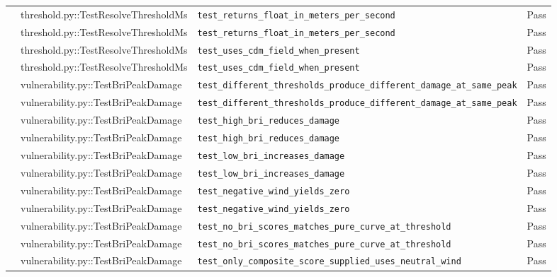 \documentclass[11pt,a4paper]{article}
\begin{document}
\begin{center}
\begin{longtable}{p{2.2cm} p{4.5cm} p{6.5cm} p{1.4cm}}
     & threshold.py::TestResolveThresholdMs & \texttt{test\_returns\_float\_in\_meters\_per\_second} & \textcolor{green!60!black}{Pass} \\
     & threshold.py::TestResolveThresholdMs & \texttt{test\_returns\_float\_in\_meters\_per\_second} & \textcolor{green!60!black}{Pass} \\
     & threshold.py::TestResolveThresholdMs & \texttt{test\_uses\_cdm\_field\_when\_present} & \textcolor{green!60!black}{Pass} \\
     & threshold.py::TestResolveThresholdMs & \texttt{test\_uses\_cdm\_field\_when\_present} & \textcolor{green!60!black}{Pass} \\
     & vulnerability.py::TestBriPeakDamage & \texttt{test\_different\_thresholds\_produce\_different\_damage\_at\_same\_peak} & \textcolor{green!60!black}{Pass} \\
     & vulnerability.py::TestBriPeakDamage & \texttt{test\_different\_thresholds\_produce\_different\_damage\_at\_same\_peak} & \textcolor{green!60!black}{Pass} \\
     & vulnerability.py::TestBriPeakDamage & \texttt{test\_high\_bri\_reduces\_damage} & \textcolor{green!60!black}{Pass} \\
     & vulnerability.py::TestBriPeakDamage & \texttt{test\_high\_bri\_reduces\_damage} & \textcolor{green!60!black}{Pass} \\
     & vulnerability.py::TestBriPeakDamage & \texttt{test\_low\_bri\_increases\_damage} & \textcolor{green!60!black}{Pass} \\
     & vulnerability.py::TestBriPeakDamage & \texttt{test\_low\_bri\_increases\_damage} & \textcolor{green!60!black}{Pass} \\
     & vulnerability.py::TestBriPeakDamage & \texttt{test\_negative\_wind\_yields\_zero} & \textcolor{green!60!black}{Pass} \\
     & vulnerability.py::TestBriPeakDamage & \texttt{test\_negative\_wind\_yields\_zero} & \textcolor{green!60!black}{Pass} \\
     & vulnerability.py::TestBriPeakDamage & \texttt{test\_no\_bri\_scores\_matches\_pure\_curve\_at\_threshold} & \textcolor{green!60!black}{Pass} \\
     & vulnerability.py::TestBriPeakDamage & \texttt{test\_no\_bri\_scores\_matches\_pure\_curve\_at\_threshold} & \textcolor{green!60!black}{Pass} \\
     & vulnerability.py::TestBriPeakDamage & \texttt{test\_only\_composite\_score\_supplied\_uses\_neutral\_wind} & \textcolor{green!60!black}{Pass} \\

\end{longtable}
\end{center}
\end{document}
